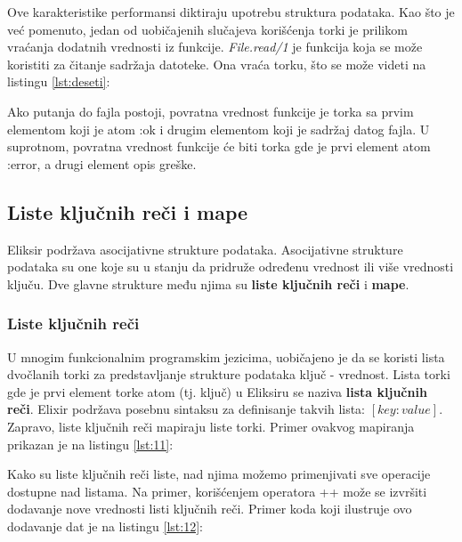 \documentclass[12pt,oneside]{memoir}
\begin{document}
Ove karakteristike performansi diktiraju upotrebu struktura podataka. Kao što je već pomenuto, jedan od uobičajenih slučajeva korišćenja torki je prilikom vraćanja dodatnih vrednosti iz funkcije. \textit{File.read/1} je funkcija koja se može koristiti za čitanje sadržaja datoteke. Ona vraća torku, što se može videti na listingu \ref{lst:deseti}:



Ako putanja do fajla postoji, povratna vrednost funkcije je torka sa prvim elementom koji je atom :ok i drugim elementom koji je sadržaj datog fajla. U suprotnom, povratna vrednost funkcije će biti torka gde je prvi element atom :error, a drugi element opis greške.

\subsection{Liste ključnih reči i mape}
Eliksir podržava asocijativne strukture podataka. Asocijativne strukture podataka su one koje su u stanju da pridruže određenu vrednost ili više vrednosti ključu. Dve glavne strukture među njima su \textbf{liste ključnih reči} i \textbf{mape}.

\subsubsection{Liste ključnih reči}
U mnogim funkcionalnim programskim jezicima, uobičajeno je da se koristi lista dvočlanih torki za predstavljanje strukture podataka ključ - vrednost. Lista torki gde je prvi element torke atom (tj. ključ) u Eliksiru se naziva \textbf{lista ključnih reči}. Elixir podržava posebnu sintaksu za definisanje takvih lista: $[key: value]$. Zapravo, liste ključnih reči mapiraju liste torki. Primer ovakvog mapiranja prikazan je na listingu \ref{lst:11}:

\newpage



 Kako su liste ključnih reči liste, nad njima možemo primenjivati sve operacije dostupne nad listama. Na primer, korišćenjem operatora ++ može se izvršiti dodavanje nove vrednosti listi ključnih reči. Primer koda koji ilustruje ovo dodavanje dat je na listingu \ref{lst:12}:


\end{document}

